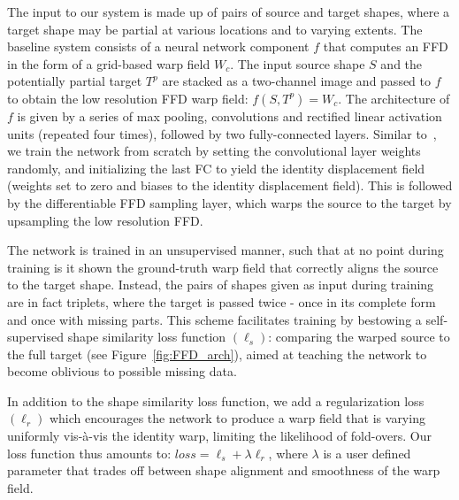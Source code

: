 \documentclass[acmtog,timestamp]{acmart}%
\begin{document}
The input to our system is made up of pairs of source and target shapes, where a target shape may be partial at various locations and to varying extents. The baseline system consists of a neural network component $f$ that computes an FFD in the form of a grid-based warp field $W_c$.
The input source shape $S$ and the potentially partial target $T^p$ are stacked as a two-channel image and passed to $f$ to obtain the low resolution FFD warp field: $f(S,T^p) = W_c$. The architecture of $f$ is given by a series of max pooling, convolutions and rectified linear activation units (repeated four times), followed by two fully-connected layers. Similar to~\cite{spatialtransformer}, we train the network from scratch by setting the convolutional layer weights randomly, and initializing the last FC to yield the identity displacement field (weights set to zero and biases to the identity displacement field). This is followed by the differentiable FFD sampling layer, which warps the source to the target by upsampling the low resolution FFD.

The network is trained in an unsupervised manner, such that at no point during training is it shown the ground-truth warp field that correctly aligns the source to the target shape.
Instead, the pairs of shapes given as input during training are in fact triplets, where the target is passed twice - once in its complete form and once with missing parts. 
This scheme facilitates training by bestowing a self-supervised shape similarity loss function $(\ell_s)$: comparing the warped source to the full target (see Figure~\ref{fig:FFD_arch}), aimed at teaching the network to become oblivious to possible missing data. 

In addition to the shape similarity loss function, we add a regularization loss $(\ell_r)$ which encourages the network to produce a warp field that is varying uniformly vis-\`a-vis the identity warp, limiting the likelihood of fold-overs. Our loss function thus amounts to: $loss = \ell_s + \lambda \ell_r$, where $\lambda$ is a user defined parameter that trades off between shape alignment and smoothness of the warp field.
\end{document}

